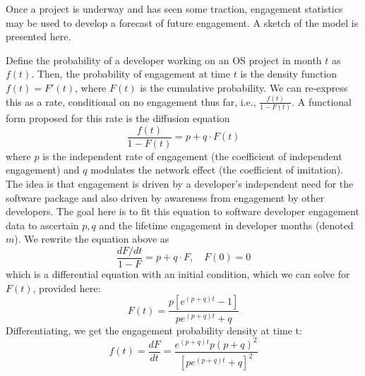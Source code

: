 \documentclass[conference]{IEEEtran}
\begin{document}
Once a project is underway and has seen some traction, engagement statistics may be used to develop a forecast of future engagement. A sketch of the model is presented here. 

Define the probability of a developer working on an OS project in month $t$ as $f(t)$. Then, the probability of engagement at time $t$ is the density function $f(t)=F'(t)$, where $F(t)$ is the cumulative probability. We can re-express this as a rate, conditional on no engagement thus far, i.e., $\frac{f(t)}{1-F(t)}$. A functional form proposed for this rate is the diffusion equation
\begin{equation}
\frac{f(t)}{1-F(t)} = p + q \cdot F(t) \label{diffusion}
\end{equation}
where $p$ is the independent rate of engagement (the coefficient of independent engagement) and $q$ modulates the network effect (the coefficient of imitation). The idea is that engagement is driven by a developer’s independent need for the software package and also driven by awareness from engagement by other developers. The goal here is to fit this equation to software developer engagement data to ascertain $p,q$ and the lifetime engagement in developer months (denoted $m$). We rewrite the equation above as 
\begin{equation}
\frac{dF/dt}{1-F} = p + q \cdot F, \quad F(0)=0
\end{equation}
which is a differential equation with an initial condition, which we can solve for $F(t)$, provided here: 
\begin{equation}
F(t) = \frac{p[e^{(p+q)t}-1]}{p e^{(p+q)t}+q}
\end{equation}
Differentiating, we get the engagement probability density at time t:
\begin{equation}
f(t) = \frac{dF}{dt} = \frac{e^{(p+q)t} p (p+q)^2}{[p e^{(p+q)t}+q]^2} \label{ft}
\end{equation}
\end{document}

